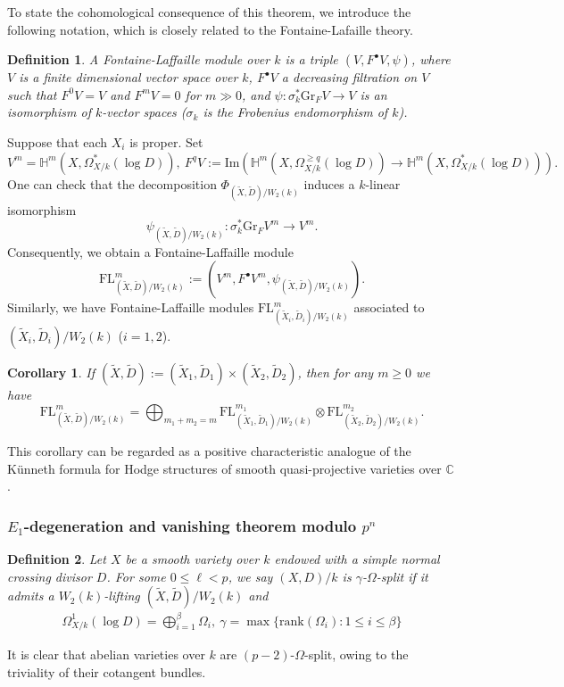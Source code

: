 \documentclass[12pt, a4paper]{article}
\newtheorem{definition}{Definition}[section]
\newtheorem{corollary}{Corollary}[section]
\begin{document}
To state the cohomological consequence of this theorem, we introduce the following notation, which is closely related to the Fontaine-Lafaille theory.
\begin{definition}
A Fontaine-Laffaille module over $k$ is a triple $(V,F^\bullet V,\psi)$, where $V$ is a finite dimensional vector space over $k$, $F^\bullet V$ a decreasing filtration on $V$ such that $F^0V=V$ and $F^mV=0$ for $m\gg0$, and $\psi:\sigma^*_k\mathrm{Gr}_FV\to V$ is an isomorphism of $k$-vector spaces ($\sigma_k$ is the Frobenius endomorphism of $k$).
\end{definition}
Suppose that each $X_i$ is proper. Set 
$$
V^m=\mathbb H^m(X,\Omega^*_{X/k}(\log D)),~F^qV:=\mathrm{Im}(\mathbb H^m(X,\Omega^{\geq q}_{X/k}(\log D))\to\mathbb H^m(X,\Omega^*_{X/k}(\log D))).
$$
One can check that the decomposition $\Phi_{(\tilde X,\tilde D)/W_2(k)}$ induces a $k$-linear isomorphism $$\psi_{(\tilde X,\tilde D)/W_2(k)}:\sigma_k^*\mathrm{Gr}_FV^m\to V^m.$$ Consequently, we obtain a Fontaine-Laffaille module $$\mathrm{FL}^m_{(\tilde X,\tilde D)/W_2(k)}:=(V^m,F^\bullet V^m,\psi_{(\tilde X,\tilde D)/W_2(k)}).$$
Similarly, we have Fontaine-Laffaille modules $\mathrm{FL}^m_{(\tilde X_i,\tilde D_i)/W_2(k)}$ associated to $(\tilde X_i,\tilde D_i)/W_2(k)$  ($i=1,2$).
\begin{corollary}
If $(\tilde X,\tilde D):=(\tilde X_1,\tilde D_1)\times(\tilde X_2,\tilde D_2)$, then for any $m\geq0$ we have
$$
\mathrm{FL}^m_{(\tilde X,\tilde D)/W_2(k)}=\bigoplus_{m_1+m_2=m}\mathrm{FL}^{m_1}_{(\tilde X_1,\tilde D_1)/W_2(k)}\otimes\mathrm{FL}^{m_2}_{(\tilde X_2,\tilde D_2)/W_2(k)}.$$
\end{corollary}
This corollary can be regarded as a positive characteristic analogue of the K\"unneth formula for Hodge structures of smooth quasi-projective varieties over $\mathbb C$.
\fi

\subsubsection{$E_1$-degeneration and vanishing theorem modulo $p^n$}
\iffalse
\begin{definition}\label{cotangent splitting}
Let $X$ be a smooth variety over $k$ endowed with a simple normal crossing divisor $D$.
For some $0\leq\ell<p$, we say $(X,D)/k$ is $\gamma$-$\Omega$-split if it admits a $W_2(k)$-lifting $(\tilde X,\tilde D)/W_2(k)$ and
\begin{eqnarray}\label{ell-omega-split}
\Omega^1_{X/k}(\log D)=\bigoplus_{i=1}^\beta\Omega_i,~\gamma=\max\{\mathrm{rank}(\Omega_i):1\leq i\leq\beta\}
\end{eqnarray}
\end{definition}
It is clear that abelian varieties over $k$ are $(p{-}2)$-$\Omega$-split, owing to the triviality of their cotangent bundles.
\end{document}
